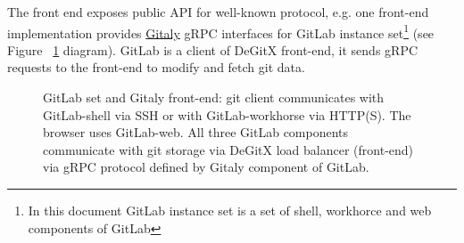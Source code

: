 \documentclass[acmlarge, screen, nonacm, 11pt]{acmart}
\begin{document}
The front end exposes public API for well-known protocol, e.g. one front-end implementation provides
\href{https://docs.gitlab.com/ee/administration/gitaly/}{Gitaly} gRPC interfaces for GitLab
instance set\footnote{In this document GitLab instance set is a set of shell, workhorce and web components of GitLab}
(see Figure ~\ref{fig:gitlab-set} diagram). GitLab is a client of DeGitX front-end, it sends gRPC requests to the
front-end to modify and fetch git data.

\begin{figure}
  \begin{center}
  \end{center}
  \caption{
    GitLab set and Gitaly front-end:
    git client communicates with GitLab-shell via SSH or with GitLab-workhorse via HTTP(S).
    The browser uses GitLab-web. All three GitLab components communicate with git storage via DeGitX load balancer
    (front-end) via gRPC protocol defined by Gitaly component of GitLab.
  }\label{fig:gitlab-set}
\end{figure}
\end{document}
